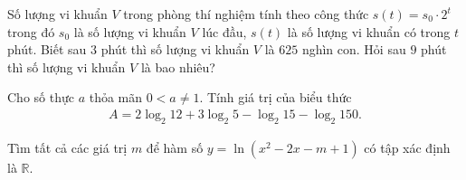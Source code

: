 \hienthiloigiaibt
\begin{bt}%
	Số lượng vi khuẩn $V$ trong phòng thí nghiệm tính theo công thức $s(t) = s_0 \cdot 2^t$ trong đó $s_0$ là số lượng vi khuẩn $V$ lúc đầu, $s(t)$ là số lượng vi khuẩn có trong $t$ phút. Biết sau $3$ phút thì số lượng vi khuẩn $V$ là $625$ nghìn con. Hỏi sau $9$ phút thì số lượng vi khuẩn $V$ là bao nhiêu?
\end{bt}
\begin{bt}%
	Cho số thực $a$ thỏa mãn $0 < a \neq 1$. Tính giá trị của biểu thức
 \begin{align*}
     A = 2\log_{2}{12} + 3\log_{2}{5} - \log_{2}{15} - \log_{2}{150}.
 \end{align*}
\end{bt} 
\begin{bt}%
Tìm tất cả các giá trị $m$ để hàm số $y = \ln{\left(x^2 - 2x - m + 1 \right)}$ có tập xác định là $\mathbb{R}$.	
\end{bt} 
